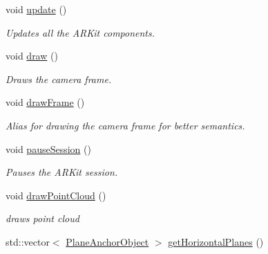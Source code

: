 \begin{DoxyCompactItemize}
\mbox{\label{class_a_r_processor_a76b6cbb62dcc0aa87e38e48cc8dbe621}} 
void \hyperlink{class_a_r_processor_a76b6cbb62dcc0aa87e38e48cc8dbe621}{update} ()
\begin{DoxyCompactList}\small\item\em Updates all the A\+R\+Kit components. \end{DoxyCompactList}\item 
\mbox{\label{class_a_r_processor_a20418bd305702c3346a109da9e1afcb0}} 
void \hyperlink{class_a_r_processor_a20418bd305702c3346a109da9e1afcb0}{draw} ()
\begin{DoxyCompactList}\small\item\em Draws the camera frame. \end{DoxyCompactList}\item 
\mbox{\label{class_a_r_processor_a685469fa6b66b8b5d935f6f45a2ef599}} 
void \hyperlink{class_a_r_processor_a685469fa6b66b8b5d935f6f45a2ef599}{draw\+Frame} ()
\begin{DoxyCompactList}\small\item\em Alias for drawing the camera frame for better semantics. \end{DoxyCompactList}\item 
\mbox{\label{class_a_r_processor_a035d352220785ee03e1bb15ba6bf688d}} 
void \hyperlink{class_a_r_processor_a035d352220785ee03e1bb15ba6bf688d}{pause\+Session} ()
\begin{DoxyCompactList}\small\item\em Pauses the A\+R\+Kit session. \end{DoxyCompactList}\item 
\mbox{\label{class_a_r_processor_ae938bf188d56d8b30b141b2fa23e96f8}} 
void \hyperlink{class_a_r_processor_ae938bf188d56d8b30b141b2fa23e96f8}{draw\+Point\+Cloud} ()
\begin{DoxyCompactList}\small\item\em draws point cloud \end{DoxyCompactList}\item 
\mbox{\label{class_a_r_processor_a3cd70af245be375d56a06e2ea8d068f9}} 
std\+::vector$<$ \hyperlink{struct_a_r_objects_1_1_plane_anchor_object}{Plane\+Anchor\+Object} $>$ \hyperlink{class_a_r_processor_a3cd70af245be375d56a06e2ea8d068f9}{get\+Horizontal\+Planes} ()

\end{DoxyCompactItemize}
